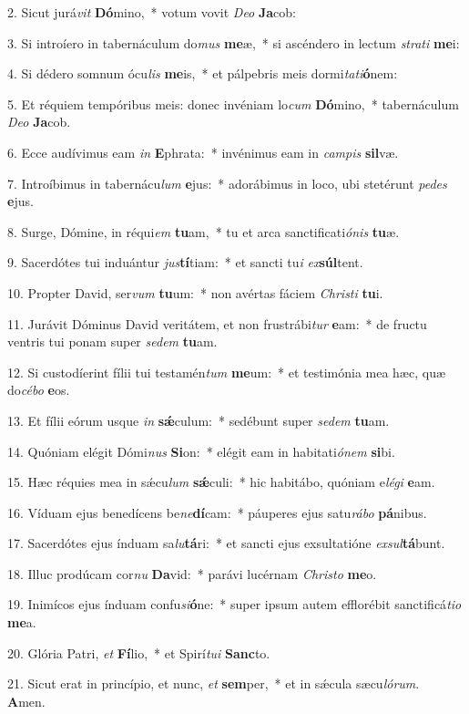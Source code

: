 2. Sicut jurá\textit{vit} \textbf{Dó}mino,~*  votum vovit \textit{De}\textit{o} \textbf{Ja}cob:\

3. Si introíero in tabernáculum do\textit{mus} \textbf{me}æ,~*  si ascéndero in lectum \textit{stra}\textit{ti} \textbf{me}i:\

4. Si dédero somnum ócu\textit{lis} \textbf{me}is,~*  et pálpebris meis dormi\textit{ta}\textit{ti}\textbf{ó}nem:\

5. Et réquiem tempóribus meis: donec invéniam lo\textit{cum} \textbf{Dó}mino,~*  tabernáculum \textit{De}\textit{o} \textbf{Ja}cob.\

6. Ecce audívimus eam \textit{in} \textbf{E}phrata:~*  invénimus eam in \textit{cam}\textit{pis} \textbf{sil}væ.\

7. Introíbimus in tabernácu\textit{lum} \textbf{e}jus:~*  adorábimus in loco, ubi stetérunt \textit{pe}\textit{des} \textbf{e}jus.\

8. Surge, Dómine, in réqui\textit{em} \textbf{tu}am,~*  tu et arca sanctificati\textit{ó}\textit{nis} \textbf{tu}æ.\

9. Sacerdótes tui induántur \textit{jus}\textbf{tí}tiam:~*  et sancti tu\textit{i} \textit{ex}\textbf{súl}tent.\

10. Propter David, ser\textit{vum} \textbf{tu}um:~*  non avértas fáciem \textit{Chris}\textit{ti} \textbf{tu}i.\

11. Jurávit Dóminus David veritátem, et non frustrábi\textit{tur} \textbf{e}am:~*  de fructu ventris tui ponam super \textit{se}\textit{dem} \textbf{tu}am.\

12. Si custodíerint fílii tui testamén\textit{tum} \textbf{me}um:~*  et testimónia mea hæc, quæ do\textit{cé}\textit{bo} \textbf{e}os.\

13. Et fílii eórum usque \textit{in} \textbf{sǽ}culum:~*  sedébunt super \textit{se}\textit{dem} \textbf{tu}am.\

14. Quóniam elégit Dómi\textit{nus} \textbf{Si}on:~*  elégit eam in habitati\textit{ó}\textit{nem} \textbf{si}bi.\

15. Hæc réquies mea in sǽcu\textit{lum} \textbf{sǽ}culi:~*  hic habitábo, quóniam e\textit{lé}\textit{gi} \textbf{e}am.\

16. Víduam ejus benedícens be\textit{ne}\textbf{dí}cam:~*  páuperes ejus satu\textit{rá}\textit{bo} \textbf{pá}nibus.\

17. Sacerdótes ejus índuam sa\textit{lu}\textbf{tá}ri:~*  et sancti ejus exsultatióne \textit{ex}\textit{sul}\textbf{tá}bunt.\

18. Illuc prodúcam cor\textit{nu} \textbf{Da}vid:~*  parávi lucérnam \textit{Chris}\textit{to} \textbf{me}o.\

19. Inimícos ejus índuam confu\textit{si}\textbf{ó}ne:~*  super ipsum autem efflorébit sanctificá\textit{ti}\textit{o} \textbf{me}a.\

20. Glória Patri, \textit{et} \textbf{Fí}lio,~*  et Spirí\textit{tu}\textit{i} \textbf{Sanc}to.\

21. Sicut erat in princípio, et nunc, \textit{et} \textbf{sem}per,~*  et in sǽcula sæcu\textit{ló}\textit{rum}. \textbf{A}men.\

